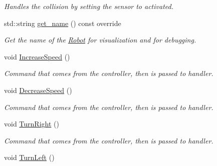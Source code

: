\begin{DoxyCompactItemize}
\begin{DoxyCompactList}\small\item\em Handles the collision by setting the sensor to activated. \end{DoxyCompactList}\item 
std\+::string \hyperlink{class_robot_a3f77c13705b8f60480d21d8d936dc39e}{get\+\_\+name} () const override\hypertarget{class_robot_a3f77c13705b8f60480d21d8d936dc39e}{}\label{class_robot_a3f77c13705b8f60480d21d8d936dc39e}

\begin{DoxyCompactList}\small\item\em Get the name of the \hyperlink{class_robot}{Robot} for visualization and for debugging. \end{DoxyCompactList}\item 
void \hyperlink{class_robot_ae4647cccd002ca13659017e634237ead}{Increase\+Speed} ()\hypertarget{class_robot_ae4647cccd002ca13659017e634237ead}{}\label{class_robot_ae4647cccd002ca13659017e634237ead}

\begin{DoxyCompactList}\small\item\em Command that comes from the controller, then is passed to handler. \end{DoxyCompactList}\item 
void \hyperlink{class_robot_a94afa6f63eb22667261c07933faae481}{Decrease\+Speed} ()\hypertarget{class_robot_a94afa6f63eb22667261c07933faae481}{}\label{class_robot_a94afa6f63eb22667261c07933faae481}

\begin{DoxyCompactList}\small\item\em Command that comes from the controller, then is passed to handler. \end{DoxyCompactList}\item 
void \hyperlink{class_robot_a12b5883779f682c66e71bc54b6539694}{Turn\+Right} ()\hypertarget{class_robot_a12b5883779f682c66e71bc54b6539694}{}\label{class_robot_a12b5883779f682c66e71bc54b6539694}

\begin{DoxyCompactList}\small\item\em Command that comes from the controller, then is passed to handler. \end{DoxyCompactList}\item 
void \hyperlink{class_robot_ad864d21d997dbadf55f997c2f0143d41}{Turn\+Left} ()\hypertarget{class_robot_ad864d21d997dbadf55f997c2f0143d41}{}\label{class_robot_ad864d21d997dbadf55f997c2f0143d41}


\end{DoxyCompactItemize}
